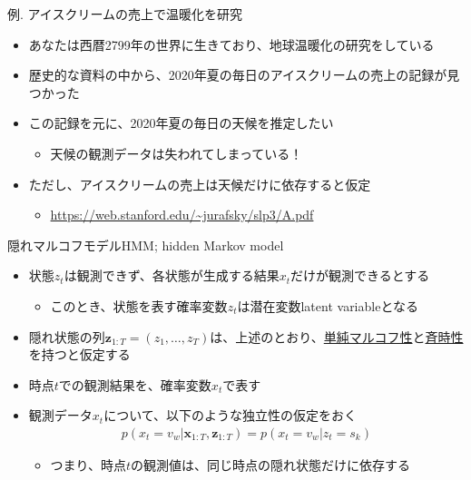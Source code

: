 \documentclass[aspectratio=169,unicode,dvipdfmx,14pt]{beamer}
\begin{document}
\begin{frame}{例. アイスクリームの売上で温暖化を研究}
\begin{itemize}
\item あなたは西暦2799年の世界に生きており、地球温暖化の研究をしている
\item 歴史的な資料の中から、2020年夏の毎日のアイスクリームの売上の記録が見つかった
\item この記録を元に、2020年夏の毎日の天候を推定したい
\begin{itemize}
\item 天候の観測データは失われてしまっている！
\end{itemize}
\item ただし、アイスクリームの売上は天候だけに依存すると仮定
\begin{itemize}
\item \href{https://web.stanford.edu/~jurafsky/slp3/A.pdf}{https://web.stanford.edu/\~{}jurafsky/slp3/A.pdf}
\end{itemize}
\end{itemize}
\end{frame}


\begin{frame}{隠れマルコフモデルHMM; hidden Markov model}
\begin{itemize}
\item 状態$z_t$は観測できず、各状態が生成する結果$x_t$だけが観測できるとする
\begin{itemize}
\item このとき、状態を表す確率変数$z_t$は潜在変数latent variableとなる
\end{itemize}
\item 隠れ状態の列$\bm{z}_{1:T}=(z_1,\ldots,z_T)$は、上述のとおり、\underline{単純マルコフ性}と\underline{斉時性}を持つと仮定する
\item 時点$t$での観測結果を、確率変数$x_t$で表す
\item 観測データ$x_t$について、以下のような独立性の仮定をおく
\begin{align}
p(x_t=v_w| \bm{x}_{1:T},\bm{z}_{1:T}) = p(x_t=v_w|z_t=s_k)
\end{align}
\vspace{-.2in}
\begin{itemize}
\item つまり、時点$t$の観測値は、同じ時点の隠れ状態だけに依存する
\end{itemize}
\end{itemize}
\end{frame}
\end{document}
